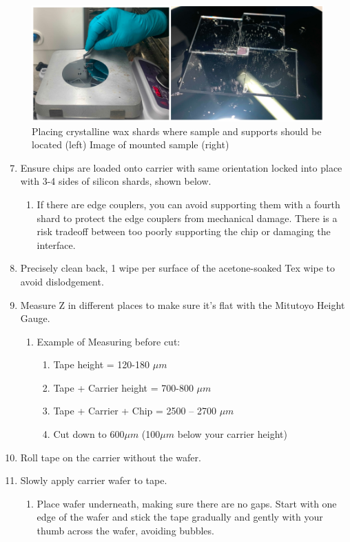 \begin{figure}[!ht]
\centering
\includegraphics[width=5in]{./Figures/AppendixA/FigAppA07}
\caption[Placing crystalline wax shards where sample and supports are to be located.]{Placing crystalline wax shards where sample and supports should be located (left) Image of mounted sample (right)}
\label{FigAppA7}
\end{figure}

\begin{enumerate}
    \setcounter{enumi}{6}
    \item Ensure chips are loaded onto carrier with same orientation locked into place with 3-4 sides of silicon shards, shown below.
    \begin{enumerate}
        \item If there are edge couplers, you can avoid supporting them with a fourth shard to protect the edge couplers from mechanical damage. There is a risk tradeoff between too poorly supporting the chip or damaging the interface.
    \end{enumerate}
    \item Precisely clean back, 1 wipe per surface of the acetone-soaked Tex wipe to avoid dislodgement.
    \item Measure Z in different places to make sure it’s flat with the Mitutoyo Height Gauge. 
    \begin{enumerate}
        \item Example of Measuring before cut: 
        \begin{enumerate}
            \item Tape height = 120-180 $\mu m$
            \item Tape + Carrier height = 700-800 $\mu m$
            \item Tape + Carrier + Chip = 2500 – 2700 $\mu m$
            \item Cut down to 600$\mu m$ (100$\mu m$ below your carrier height)
        \end{enumerate}
    \end{enumerate}
    \item Roll tape on the carrier without the wafer. 
    \item Slowly apply carrier wafer to tape.
    \begin{enumerate}
        \item Place wafer underneath, making sure there are no gaps. Start with one edge of the wafer and stick the tape gradually and gently with your thumb across the wafer, avoiding bubbles. 
    \end{enumerate}
\end{enumerate}

